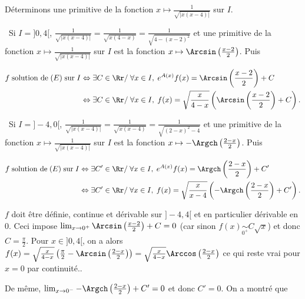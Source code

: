 {{Déterminons une primitive de la fonction $x\mapsto\frac{1}{\sqrt{|x(x-4)|}}$ sur $I$.

\textbullet~Si $I=]0,4[$, $\frac{1}{\sqrt{|x(x-4)|}}=\frac{1}{\sqrt{x(4-x)}}=\frac{1}{\sqrt{4-(x-2)^2}}$ et une primitive de la fonction $x\mapsto\frac{1}{\sqrt{|x(x-4)|}}$ sur $I$ est la fonction $x\mapsto\Arcsin\left(\frac{x-2}{2}\right)$. Puis

\begin{align*}\ensuremath
f\;\text{solution de}\;(E)\;\text{sur}\;I&\Leftrightarrow\exists C\in\Rr/\;\forall x\in I,\;e^{A(x)}f(x)=\Arcsin\left(\frac{x-2}{2}\right)+C\\
 &\Leftrightarrow\exists C\in\Rr/\;\forall x\in I,\;f(x)=\sqrt{\frac{x}{4-x}}\left(\Arcsin\left(\frac{x-2}{2}\right)+C\right).
\end{align*}

\textbullet~Si $I=]-4,0[$, $\frac{1}{\sqrt{|x(x-4)|}}=\frac{1}{\sqrt{x(x-4)}}=\frac{1}{\sqrt{(2-x)^2-4}}$ et une primitive de la fonction $x\mapsto\frac{1}{\sqrt{|x(x-4)|}}$ sur $I$ est la fonction $x\mapsto-\Argch\left(\frac{2-x}{2}\right)$. Puis

\begin{align*}\ensuremath
f\;\text{solution de}\;(E)\;\text{sur}\;I&\Leftrightarrow\exists C'\in\Rr/\;\forall x\in I,\;e^{A(x)}f(x)=\Argch\left(\frac{2-x}{2}\right)+C'\\
 &\Leftrightarrow\exists C'\in\Rr/\;\forall x\in I,\;f(x)=\sqrt{\frac{x}{x-4}}\left(-\Argch\left(\frac{2-x}{2}\right)+C'\right).
\end{align*}

$f$ doit être définie, continue et dérivable sur $]-4,4[$ et en particulier dérivable en $0$. Ceci impose $\lim_{x \rightarrow 0^+}\Arcsin\left(\frac{x-2}{2}\right)+C=0$ (car sinon $f(x)\underset{0^+}{\sim}C\sqrt{x}$) et donc $C=\frac{\pi}{2}$. Pour $x\in]0,4[$, on a alors $f(x)=\sqrt{\frac{x}{4-x}}\left(\frac{\pi}{2}-\Arcsin\left(\frac{2-x}{2}\right)\right)=\sqrt{\frac{x}{4-x}}\Arccos\left(\frac{2-x}{2}\right)$ ce qui reste vrai pour $x=0$ par continuité..

De même, $\lim_{x \rightarrow 0^-}-\Argch\left(\frac{2-x}{2}\right)+C'=0$ et donc $C'=0$. On a montré que

\begin{center}
\fbox{
$\forall x\in]-4,4[,\;\sum_{n=1}^{+\infty}\frac{1}{nC_{2n}^n}x^n=\left\{
\begin{array}{l}
\sqrt{\frac{x}{4-x}}\Arccos\left(\frac{2-x}{2}\right)\;\text{si}\;x\in[0,4[\\
-\sqrt{\frac{x}{x-4}}\Argch\left(\frac{2-x}{2}\right)\;\text{si}\;x\in]-4,0]
\end{array}
\right.
$.
}
\end{center}
}
}
